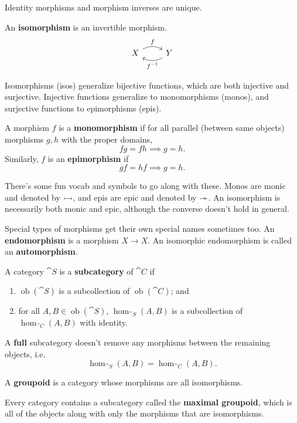 \documentclass[twoside,10pt]{report}
\DeclareMathOperator{\ob}{ob}
\begin{document}
\begin{prop}
Identity morphisms and morphism inverses are unique.
\end{prop}

\begin{defn}[]
An \textbf{isomorphism} is an invertible morphism.
\[
\begin{tikzcd}
	X \rar[bend left]{f} & Y \lar[bend left]{f^{-1}}
\end{tikzcd}
\] 
\end{defn}
Isomorphisms (isos) generalize bijective functions, which are both injective and surjective. Injective functions generalize to monomorphisms (monos), and surjective functions to epimorphisms (epis).
\begin{defn}[]
	A morphism $f$ is a \textbf{monomorphism} if for all parallel (between same objects) morphisms $g,h$ with the proper domains,
	\[
	fg = fh \implies g=h.
	\] Similarly, $f$ is an \textbf{epimorphism} if
	\[
	gf = hf \implies g=h.
	\] 
\end{defn}
There's some fun vocab and symbols to go along with these. Monos are monic and denoted by $\rightarrowtail$, and epis are epic and denoted by $\twoheadrightarrow$. An isomorphism is necessarily both monic and epic, although the converse doesn't hold in general.

Special types of morphisms get their own special names sometimes too. An \textbf{endomorphism} is a morphism $X\to X$. An isomorphic endomorphism is called an \textbf{automorphism}.
\begin{defn}
	A category $\cat{S}$ is a \textbf{subcategory} of $\cat{C}$ if
	\begin{enumerate}
		\item $\ob(\cat{S})$ is a subcollection of $\ob(\cat{C})$; and
		\item for all $A, B \in \ob(\cat{S})$, $\hom_{\cat{S}}(A,B)$ is a subcollection of $\hom_{\cat{C}}(A,B)$ with identity.
	\end{enumerate}
\end{defn}
A \textbf{full} subcategory doesn't remove any morphisms between the remaining objects, i.e.
\[
	\hom_{\cat{S} }(A,B) = \hom_{\cat{C} }(A,B).
\]

\begin{defn}[]
A \textbf{groupoid} is a category whose morphisms are all isomorphisms.
\end{defn}
Every category contains a subcategory called the \textbf{maximal groupoid}, which is all of the objects along with only the morphisms that are isomorphisms.
\end{document}
